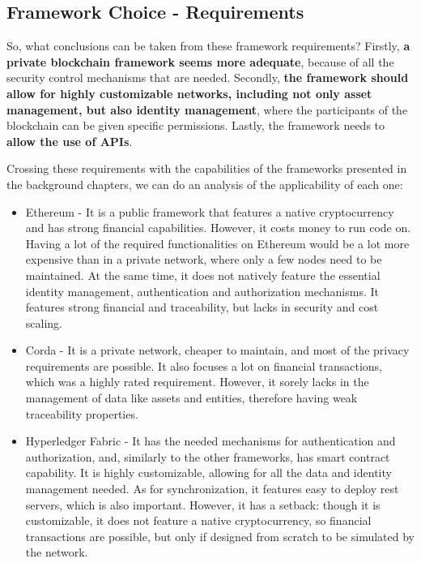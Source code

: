 
\subsection{Framework Choice - Requirements}

So, what conclusions can be taken from these framework requirements? Firstly, \textbf{a private blockchain framework seems more adequate}, because of all the security control mechanisms that are needed. Secondly, \textbf{the framework should allow for highly customizable networks, including not only asset management, but also identity management}, where the participants of the blockchain can be given specific permissions. Lastly, the framework needs to \textbf{allow the use of APIs}.

Crossing these requirements with the capabilities of the frameworks presented in the background chapters, we can do an analysis of the applicability of each one:
\begin{itemize}
	\item Ethereum - It is a public framework that features a native cryptocurrency and has strong financial capabilities. However, it costs money to run code on. Having a lot of the required functionalities on Ethereum would be a lot more expensive than in a private network, where only a few nodes need to be maintained. At the same time, it does not natively feature the essential identity management, authentication and authorization mechanisms. It features strong financial and traceability, but lacks in security and cost scaling.
	\item Corda - It is a private network, cheaper to maintain, and most of the privacy requirements are possible. It also focuses a lot on financial transactions, which was a highly rated requirement. However, it sorely lacks in the management of data like assets and entities, therefore having weak traceability properties.
	\item Hyperledger Fabric - It has the needed mechanisms for authentication and authorization, and, similarly to the other frameworks, has smart contract capability. It is highly customizable, allowing for all the data and identity management needed. As for synchronization, it features easy to deploy rest servers, which is also important. However, it has a setback: though it is customizable, it does not feature a native cryptocurrency, so financial transactions are possible, but only if designed from scratch to be simulated by the network.
\end{itemize}


